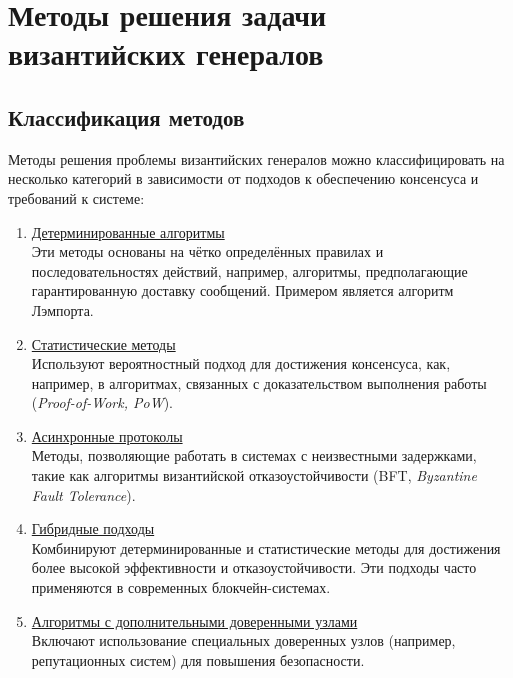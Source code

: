\section{Методы решения задачи византийских генералов}

\subsection{Классификация методов}

\hspace{1.25cm}
Методы решения проблемы византийских генералов можно классифицировать на несколько категорий в зависимости от подходов к обеспечению консенсуса и требований к системе:

\begin{enumerate}

    \item \underline{Детерминированные алгоритмы}\\
    Эти методы основаны на чётко определённых правилах и последовательностях действий, например, алгоритмы, предполагающие гарантированную доставку сообщений. Примером является алгоритм Лэмпорта.

    \item \underline{Статистические методы}\\
    Используют вероятностный подход для достижения консенсуса, как, например, в алгоритмах, связанных с доказательством выполнения работы (\textit{Proof-of-Work, PoW}).

    \item \underline{Асинхронные протоколы}\\
    Методы, позволяющие работать в системах с неизвестными задержками, такие как алгоритмы византийской отказоустойчивости (BFT, \textit{Byzantine Fault Tolerance}).

    \item \underline{Гибридные подходы}\\
    Комбинируют детерминированные и статистические методы для достижения более высокой эффективности и отказоустойчивости. Эти подходы часто применяются в современных блокчейн-системах.

    \item \underline{Алгоритмы с дополнительными доверенными узлами}\\
    Включают использование специальных доверенных узлов (например, репутационных систем) для повышения безопасности.

\end{enumerate}

